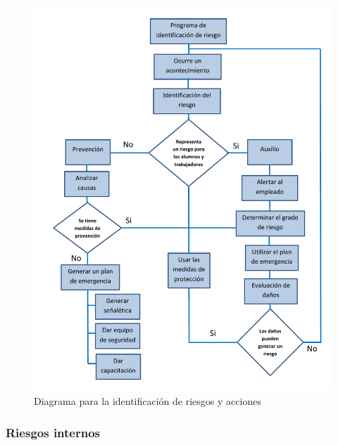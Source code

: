     \begin{figure}[H]
    \centering
    \includegraphics[scale=0.32]{19/Img/diagrama-1.pdf}
    \caption{Diagrama para la identificación de riesgos y acciones}
    \label{fig:diagrama-1}
    \end{figure}

     \subsubsection{Riesgos internos}

